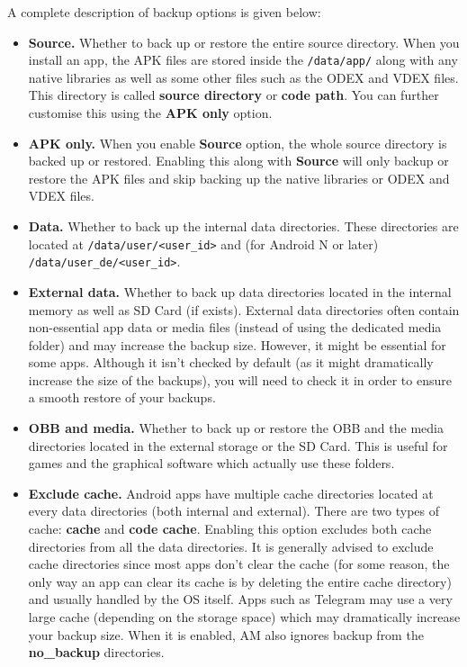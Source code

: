 A complete description of backup options is given below:
\begin{itemize}
    \item \textbf{Source.} Whether to back up or restore the entire source directory. When you install an app, the APK
    files are stored inside the \texttt{/data/app/} along with any native libraries as well as some other files such as
    the ODEX and VDEX files. This directory is called \textbf{source directory} or \textbf{code path}. You can further
    customise this using the \textbf{APK only} option.

    \item \textbf{APK only.} When you enable \textbf{Source} option, the whole source directory is backed up or
    restored. Enabling this along with \textbf{Source} will only backup or restore the APK files and skip backing up the
    native libraries or ODEX and VDEX files.

    \item \textbf{Data.} Whether to back up the internal data directories. These directories are located at
    \texttt{/data/user/<user\_id>} and (for Android N or later) \texttt{/data/user\_de/<user\_id>}.

    \item \textbf{External data.} Whether to back up data directories located in the internal memory as well as SD Card
    (if exists). External data directories often contain non-essential app data or media files (instead of using the
    dedicated media folder) and may increase the backup size. However, it might be essential for some apps. Although
    it isn't checked by default (as it might dramatically increase the size of the backups), you will need to check it
    in order to ensure a smooth restore of your backups.

    \item \textbf{OBB and media.} Whether to back up or restore the OBB and the media directories located in the
    external storage or the SD Card. This is useful for games and the graphical software which actually use these
    folders.

    \item \textbf{Exclude cache.} Android apps have multiple cache directories located at every data directories (both
    internal and external). There are two types of cache: \textbf{cache} and \textbf{code cache}. Enabling this option
    excludes both cache directories from all the data directories. It is generally advised to exclude cache directories
    since most apps don't clear the cache (for some reason, the only way an app can clear its cache is by deleting the
    entire cache directory) and usually handled by the OS itself. Apps such as Telegram may use a very large cache
    (depending on the storage space) which may dramatically increase your backup size. When it is enabled, AM also
    ignores backup from the \textbf{no\_backup} directories.


\end{itemize}

